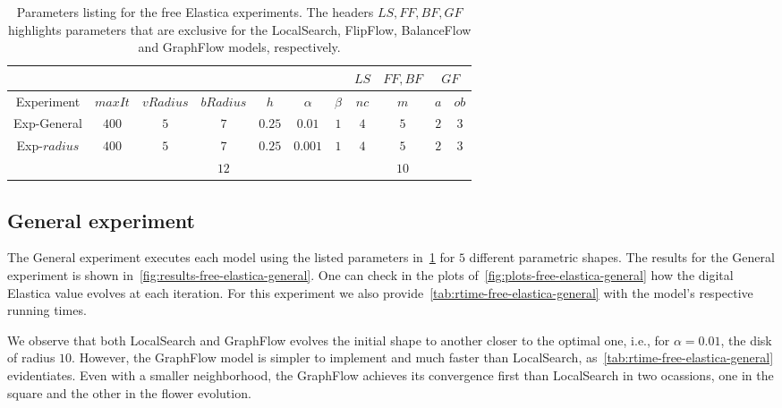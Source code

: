\begin{table}
\centering
\begin{tabular}{|c|c|c|c|c|c|c|c|c|c|c|}
\cline{8-11}
\multicolumn{7}{c|}{} & $LS$ & $FF,BF$ & \multicolumn{2}{|c|}{$GF$}\\
\hline
Experiment & $maxIt$ & $vRadius$ & $bRadius$ & $h$ & $\alpha$ & $\beta$  & $nc$ & $m$ & $a$ & $ob$ \\
\hline
Exp-General & $400$ & $5$ & $7$ & $0.25$ & $0.01$ & $1$  & $4$ & $5$ & $2$ & $3$ \\
\hline
\multirow{2}{*}{Exp-$radius$} & \multirow{2}{*}{$400$} & \multirow{2}{*}{$5$} & $7$ & \multirow{2}{*}{$0.25$} &  \multirow{2}{*}{$0.001$} & \multirow{2}{*}{$1$}  & \multirow{2}{*}{$4$} & $5$ & \multirow{2}{*}{$2$} & \multirow{2}{*}{$3$} \\
& &  & $12$ & &  & & & $10$ & &  \\
\hline
\end{tabular}
\caption{Parameters listing for the free Elastica experiments. The headers $LS,FF,BF,GF$ highlights parameters that are exclusive for the LocalSearch, FlipFlow, BalanceFlow and GraphFlow models, respectively.}
\label{tab:free-elastica-parameters-summary}
\end{table}

\subsection{General experiment}

  The General experiment executes each model using the listed parameters in~\cref{tab:free-elastica-parameters-summary} for $5$ different parametric shapes. The results for the General experiment is shown in~\cref{fig:results-free-elastica-general}. One can check in the plots of~\cref{fig:plots-free-elastica-general} how the digital Elastica value evolves at each iteration. For this experiment we also provide~\cref{tab:rtime-free-elastica-general} with the model's respective running times.
  

We observe that both LocalSearch and GraphFlow evolves the initial shape to another closer to the optimal one, i.e., for $\alpha=0.01$, the disk of radius $10$. However, the GraphFlow model is simpler to implement and much faster than LocalSearch, as~\cref{tab:rtime-free-elastica-general} evidentiates. Even with a smaller neighborhood, the GraphFlow achieves its convergence first than LocalSearch in two ocassions, one in the square and the other in the flower evolution.

